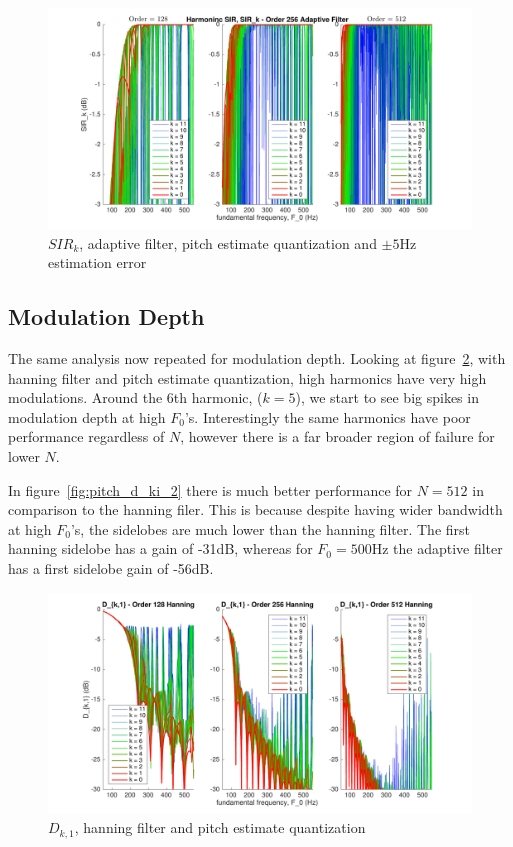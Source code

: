 \documentclass [11pt, proquest,oneside] {ganter_thesis}[2015/03/03]
\begin{document}
\begin{figure}[!ht]
  \centering
    \includegraphics[width=1\textwidth]{pitch_sir_k_2_error5}
    \caption{$SIR_k$, adaptive filter, pitch estimate quantization and $\pm5$Hz estimation error}\label{fig:pitch_sir_k_2_error5}
\end{figure}

\clearpage

\subsection{Modulation Depth}

The same analysis now repeated for modulation depth.  Looking at figure~\ref{fig:pitch_d_ki_1}, with hanning filter and pitch estimate quantization, high harmonics have very high modulations.  Around the 6th harmonic, ($k = 5$), we start to see big spikes in modulation depth at high $F_0$'s.  Interestingly the same harmonics have poor performance regardless of $N$, however there is a far broader region of failure for lower $N$.

In  figure~\ref{fig:pitch_d_ki_2} there is much better performance for $N = 512$ in comparison to the hanning filer.  This is because despite having wider bandwidth at high $F_0$'s, the sidelobes are much lower than the hanning filter.  The first hanning sidelobe has a gain of -31dB, whereas for $F_0 = 500$Hz the adaptive filter has a first sidelobe gain of -56dB.

\begin{figure}[!ht]
  \centering
    \includegraphics[width=1\textwidth]{pitch_d_ki_1}
    \caption{$D_{k,1}$, hanning filter and pitch estimate quantization}\label{fig:pitch_d_ki_1}
\end{figure}
\end{document}
